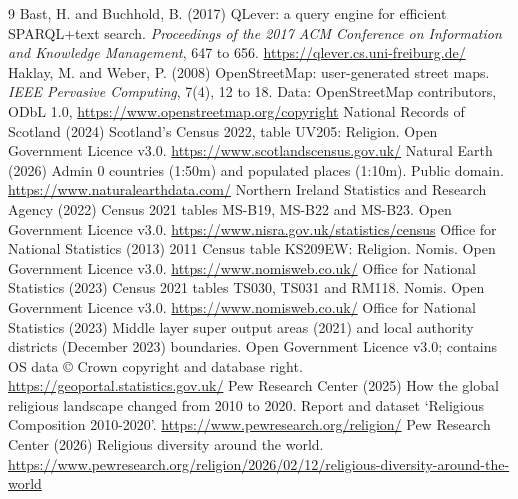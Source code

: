 \documentclass[11pt,a4paper]{article}
\begin{document}
\begin{thebibliography}{9}
 Bast, H. and Buchhold, B. (2017) QLever: a query engine for efficient SPARQL+text search. \emph{Proceedings of the 2017 ACM Conference on Information and Knowledge Management}, 647 to 656. \url{https://qlever.cs.uni-freiburg.de/}
 Haklay, M. and Weber, P. (2008) OpenStreetMap: user-generated street maps. \emph{IEEE Pervasive Computing}, 7(4), 12 to 18. Data: OpenStreetMap contributors, ODbL 1.0, \url{https://www.openstreetmap.org/copyright}
 National Records of Scotland (2024) Scotland's Census 2022, table UV205: Religion. Open Government Licence v3.0. \url{https://www.scotlandscensus.gov.uk/}
 Natural Earth (2026) Admin 0 countries (1:50m) and populated places (1:10m). Public domain. \url{https://www.naturalearthdata.com/}
 Northern Ireland Statistics and Research Agency (2022) Census 2021 tables MS-B19, MS-B22 and MS-B23. Open Government Licence v3.0. \url{https://www.nisra.gov.uk/statistics/census}
 Office for National Statistics (2013) 2011 Census table KS209EW: Religion. Nomis. Open Government Licence v3.0. \url{https://www.nomisweb.co.uk/}
 Office for National Statistics (2023) Census 2021 tables TS030, TS031 and RM118. Nomis. Open Government Licence v3.0. \url{https://www.nomisweb.co.uk/}
 Office for National Statistics (2023) Middle layer super output areas (2021) and local authority districts (December 2023) boundaries. Open Government Licence v3.0; contains OS data © Crown copyright and database right. \url{https://geoportal.statistics.gov.uk/}
 Pew Research Center (2025) How the global religious landscape changed from 2010 to 2020. Report and dataset `Religious Composition 2010-2020'. \url{https://www.pewresearch.org/religion/}
 Pew Research Center (2026) Religious diversity around the world. \url{https://www.pewresearch.org/religion/2026/02/12/religious-diversity-around-the-world}
\end{thebibliography}
\end{document}
